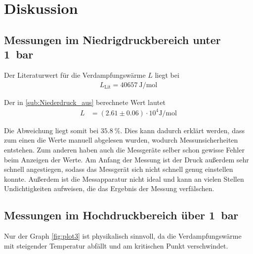\section{Diskussion}
\label{sec:Diskussion}

\subsection{Messungen im Niedrigdruckbereich unter \qty{1}{\bar}}
Der Literaturwert für die Verdampfungswärme $L$ liegt bei 
\begin{align*}
    L_{\text{Lit}}=\qty{40657}{\joule\per\mol}
\end{align*}\cite{Verdampfungswärme}

Der in \autoref{sub:Niederdruck_aus} berechnete Wert lautet
\begin{align}
    L &= (2.61\pm 0.06)\cdot 10^4 \si{\joule\per\mol}
\end{align} 

Die Abweichung liegt somit bei $\qty{35.8}{\percent}$.
Dies kann dadurch erklärt werden, dass zum einen die Werte manuell abgelesen wurden, wodurch Messunsicherheiten entstehen.
Zum anderen haben auch die Messgeräte selber schon gewisse Fehler beim Anzeigen der Werte. Am Anfang der Messung ist der Druck außerdem sehr schnell angestiegen,
sodass das Messgerät sich nicht schnell genug einstellen konnte. 
Außerdem ist die Messapparatur nicht ideal und kann an vielen Stellen Undichtigkeiten aufweisen, die das Ergebnis der Messung verfälschen.


\subsection{Messungen im Hochdruckbereich über \qty{1}{\bar}}
Nur der Graph \ref{fig:plot3} ist physikalisch sinnvoll, da die Verdampfungswärme mit steigender Temperatur abfällt und am kritischen Punkt verschwindet.

